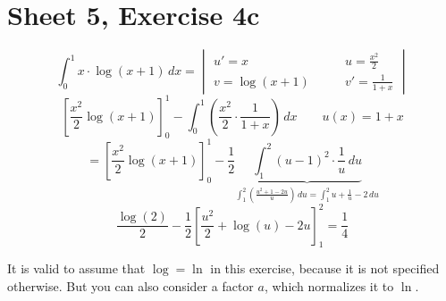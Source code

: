 \documentclass{article}
\begin{document}
\section{Sheet 5, Exercise 4c}

\[
  \int_0^1 x \cdot \log(x + 1) \, dx
    = \begin{vmatrix}
      u' = x  \qquad & u = \frac{x^2}{2}   \\
      v = \log(x+1) \qquad & v' = \frac1{1+x}
    \end{vmatrix}
\] \[
  \left[\frac{x^2}{2} \log(x+1)\right]_0^1 - \int_0^1 \left(\frac{x^2}2 \cdot \frac{1}{1+x}\right) \, dx \qquad u(x) = 1 + x
\] \[
  = \left[\frac{x^2}{2} \log(x+1)\right]_0^1 - \frac12 \underbrace{\int_1^2 (u - 1)^2 \cdot \frac1u \, du}_{\int_1^2 \left(\frac{u^2 + 1 - 2u}{u}\right) \, du = \int_1^2 u + \frac1u - 2 \, du}
\] \[
  \frac{\log(2)}{2} - \frac12 \left[\frac{u^2}{2} + \log(u) - 2u\right]_1^2 = \frac14
\]

It is valid to assume that $\log = \ln$ in this exercise, because it is not specified otherwise.
But you can also consider a factor $a$, which normalizes it to $\ln$.
\end{document}
